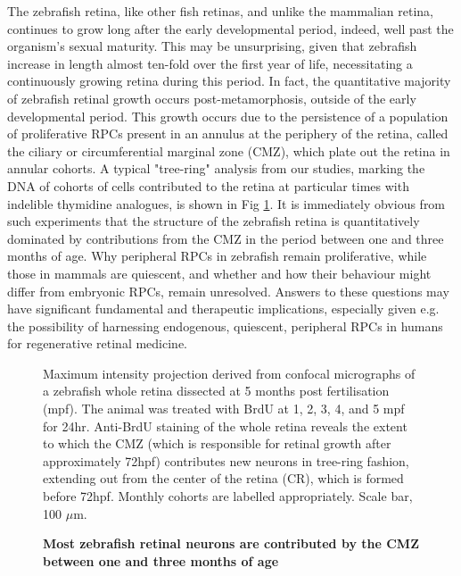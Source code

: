 The zebrafish retina, like other fish retinas, and unlike the mammalian retina, continues to grow long after the early developmental period, indeed, well past the organism's sexual maturity. This may be unsurprising, given that zebrafish increase in length almost ten-fold over the first year of life\cite{Parichy2009}, necessitating a continuously growing retina during this period. In fact, the quantitative majority of zebrafish retinal growth occurs post-metamorphosis, outside of the early developmental period. This growth occurs due to the persistence of a population of proliferative RPCs present in an annulus at the periphery of the retina, called the ciliary or circumferential marginal zone (CMZ), which plate out the retina in annular cohorts. A typical "tree-ring" analysis from our studies, marking the DNA of cohorts of cells contributed to the retina at particular times with indelible thymidine analogues, is shown in Fig \ref{RingFig}. It is immediately obvious from such experiments that the structure of the zebrafish retina is quantitatively dominated by contributions from the CMZ in the period between one and three months of age. Why peripheral RPCs in zebrafish remain proliferative, while those in mammals are quiescent\cite{Tropepe2000}, and whether and how their behaviour might differ from embryonic RPCs, remain unresolved. Answers to these questions may have significant fundamental and therapeutic implications, especially given e.g. the possibility of harnessing endogenous, quiescent, peripheral RPCs in humans for regenerative retinal medicine.

\begin{figure}[!h]
\caption{{\bf Most zebrafish retinal neurons are contributed by the CMZ between one and three months of age}}
Maximum intensity projection derived from confocal micrographs of a zebrafish whole retina dissected at 5 months post fertilisation (mpf). The animal was treated with BrdU at 1, 2, 3, 4, and 5 mpf for 24hr. Anti-BrdU staining of the whole retina reveals the extent to which the CMZ (which is responsible for retinal growth after approximately 72hpf) contributes new neurons in tree-ring fashion, extending out from the center of the retina (CR), which is formed before 72hpf. Monthly cohorts are labelled appropriately. Scale bar, 100 $\mu$m.
\label{RingFig}
\end{figure}

\FloatBarrier

